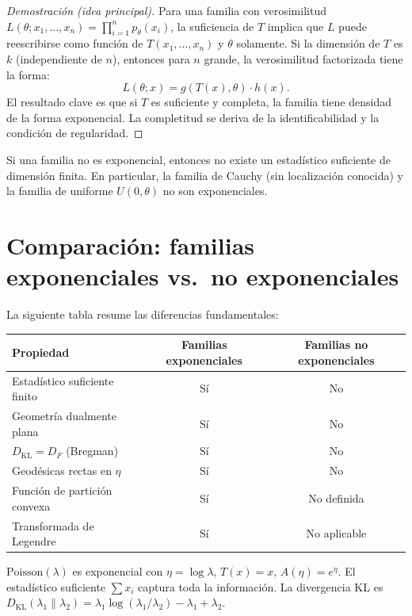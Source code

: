 \begin{proof}[Demostración (idea principal)]
	Para una familia con verosimilitud $L(\theta; x_1, \ldots, x_n) = \prod_{i=1}^n p_\theta(x_i)$, la suficiencia de $T$ implica que $L$ puede reescribirse como función de $T(x_1, \ldots, x_n)$ y $\theta$ solamente.  Si la dimensión de $T$ es $k$ (independiente de $n$), entonces para $n$ grande, la verosimilitud factorizada tiene la forma:
	\[
	L(\theta; x) = g(T(x), \theta) \cdot h(x).
	\]
	El resultado clave es que si $T$ es suficiente y completa, la familia tiene densidad de la forma exponencial.  La completitud se deriva de la identificabilidad y la condición de regularidad.
\end{proof}

\begin{corollary}
	Si una familia no es exponencial, entonces no existe un estadístico suficiente de dimensión finita.  En particular, la familia de Cauchy (sin localización conocida) y la familia de uniforme $U(0, \theta)$ no son exponenciales.
\end{corollary}

\section{Comparación: familias exponenciales vs.\ no exponenciales}

La siguiente tabla resume las diferencias fundamentales:

\begin{center}
	\renewcommand{\arraystretch}{1.3}
	\begin{tabular}{|l|c|c|}
		\hline
		\textbf{Propiedad} & \textbf{Familias exponenciales} & \textbf{Familias no exponenciales} \\
		\hline
		Estadístico suficiente finito & Sí & No \\
		Geometría dualmente plana & Sí & No \\
		$D_{\mathrm{KL}} = D_F$ (Bregman) & Sí & No \\
		Geodésicas rectas en $\eta$ & Sí & No \\
		Función de partición convexa & Sí & No definida \\
		Transformada de Legendre & Sí & No aplicable \\
		\hline
	\end{tabular}
\end{center}

\begin{example}
	$\mathrm{Poisson}(\lambda)$ es exponencial con $\eta = \log\lambda$, $T(x) = x$, $A(\eta) = e^\eta$.
	El estadístico suficiente $\sum x_i$ captura toda la información.  La divergencia KL es $D_{\mathrm{KL}}(\lambda_1 \| \lambda_2) = \lambda_1 \log(\lambda_1/\lambda_2) - \lambda_1 + \lambda_2$.
\end{example}

